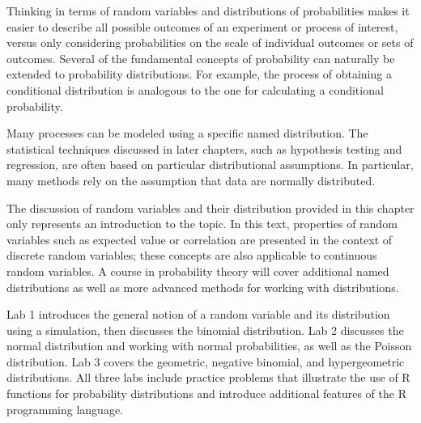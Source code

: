 Thinking in terms of random variables and distributions of probabilities makes it easier to describe all possible outcomes of an experiment or process of interest, versus only considering probabilities on the scale of individual outcomes or sets of outcomes. Several of the fundamental concepts of probability can naturally be extended to probability distributions. For example, the process of obtaining a conditional distribution is analogous to the one for calculating a conditional probability.

Many processes can be modeled using a specific named distribution. The statistical techniques discussed in later chapters, such as hypothesis testing and regression, are often based on particular distributional assumptions. In particular, many methods rely on the assumption that data are normally distributed. 

The discussion of random variables and their distribution provided in this chapter only represents an introduction to the topic. In this text, properties of random variables such as expected value or correlation are presented in the context of discrete random variables; these concepts are also applicable to continuous random variables. A course in probability theory will cover additional named distributions as well as more advanced methods for working with distributions.

Lab 1 introduces the general notion of a random variable and its distribution using a simulation, then discusses the binomial distribution.  Lab 2 discusses the normal distribution and working with normal probabilities, as well as the Poisson distribution. Lab 3 covers the geometric, negative binomial, and hypergeometric distributions.  All three labs include practice problems that illustrate the use of \textsf{R} functions for probability distributions and introduce additional features of the \textsf{R} programming language.

